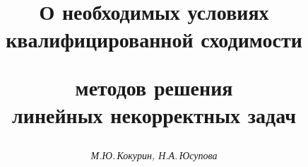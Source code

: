 

 




 


\newcommand{\vraisup}{\operatornamewithlimits{vrai\;sup}} 


\newcommand{\tts}[1]{} 


 




\setcounter{page}{39} 












 


\author{\it М.Ю.\,Кокурин, Н.А.\,Юсупова} 




\title{О необходимых условиях\\ квалифицированной сходимости  


методов решения\\ линейных некорректных задач} 


 


\date{} 




\pagestyle{plain} %


 




\maketitle 


